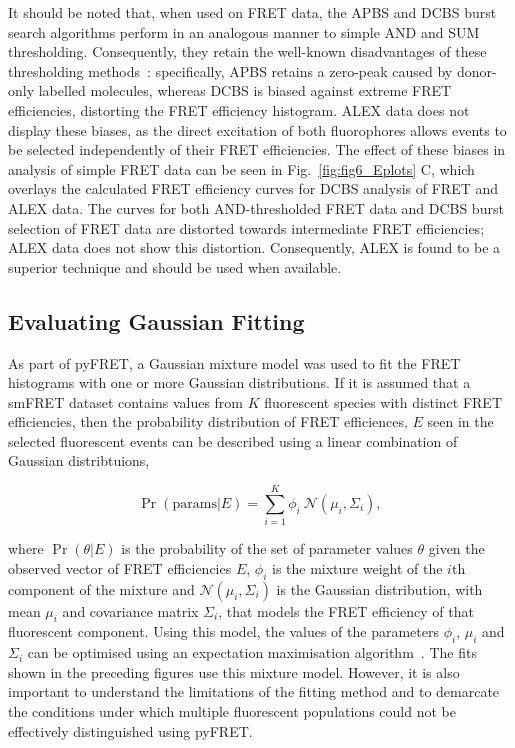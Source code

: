 It should be noted that, when used on FRET data, the APBS and DCBS burst search algorithms perform in an analogous manner to simple AND and SUM thresholding. Consequently, they retain the well-known disadvantages of these thresholding methods~\cite{murphy14}: specifically, APBS retains a zero-peak caused by donor-only labelled molecules, whereas DCBS is biased against extreme FRET efficiencies, distorting the FRET efficiency histogram. ALEX data does not display these biases, as the direct excitation of both fluorophores allows events to be selected independently of their FRET efficiencies. The effect of these biases in analysis of simple FRET data can be seen in Fig.~\ref{fig:fig6_Eplots} C, which overlays the calculated FRET efficiency curves for DCBS analysis of FRET and ALEX data. The curves for both AND-thresholded FRET data and DCBS burst selection of FRET data are distorted towards intermediate FRET efficiencies; ALEX data does not show this distortion. Consequently, ALEX is found to be a superior technique and should be used when available.

\subsection{Evaluating Gaussian Fitting}
\label{subsec:eval-gauu-fit-expl}
As part of pyFRET, a Gaussian mixture model was used to fit the FRET histograms with one or more Gaussian distributions. If it is assumed that a smFRET dataset contains values from $K$ fluorescent species with distinct FRET efficiencies, then the probability distribution of FRET efficiences, $E$ seen in the selected fluorescent events can be described using a linear combination of Gaussian distribtuions, 

\begin{equation}
\Pr(\text{params}|E) = \sum_{i=1}^K \phi_i~\mathcal{N}(\mu_i, \Sigma_i),
\label{eq:gmm}
\end{equation}

where $\Pr(\theta|E)$ is the probability of the set of parameter values $\theta$ given the observed vector of FRET efficiencies $E$, $\phi_i$ is the mixture weight of the $i$th component of the mixture and $\mathcal{N}(\mu_i, \Sigma_i)$ is the Gaussian distribution, with mean $\mu_i$ and covariance matrix $\Sigma_i$, that models the FRET efficiency of that fluorescent component. Using this model, the values of the parameters $\phi_i$, $\mu_i$ and $\Sigma_i$ can be optimised using an expectation maximisation algorithm~\cite{Guoshen2012}. The fits shown in the preceding figures use this mixture model. However, it is also important to understand the limitations of the fitting method and to demarcate the conditions under which multiple fluorescent populations could not be effectively distinguished using pyFRET. 

